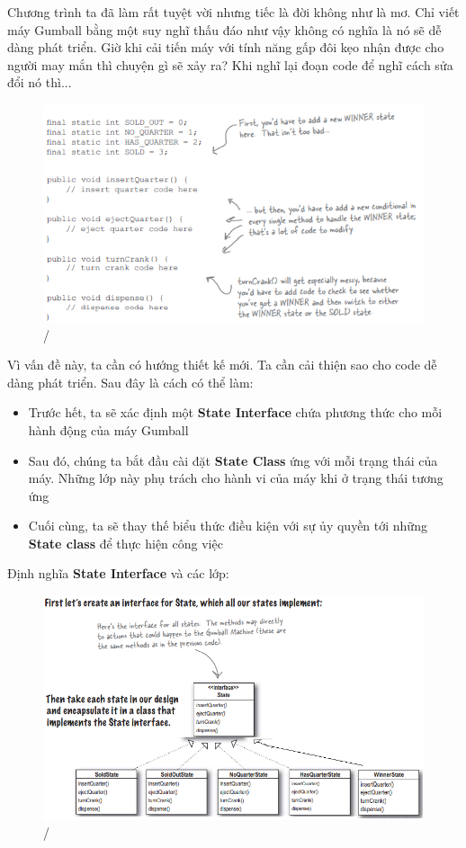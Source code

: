 Chương trình ta đã làm rất tuyệt vời nhưng tiếc là đời không như là mơ. Chỉ viết máy Gumball bằng một suy nghĩ thấu đáo như vậy không có nghĩa là nó sẽ dễ dàng phát triển. Giờ khi cải tiến máy với tính năng gấp đôi kẹo nhận được cho người may mắn thì chuyện gì sẽ xảy ra? Khi nghĩ lại đoạn code để nghĩ cách sửa đổi nó thì...
\begin{figure}[!htb]
    \centering
    \includegraphics[width=\textwidth]{fig/State/GumballProblem.png}/
\end{figure}\smallskip

\newpage
Vì vấn đề này, ta cần có hướng thiết kế mới. Ta cần cải thiện sao cho code dễ dàng phát triển. Sau đây là cách có thể làm:\smallskip

\begin{itemize}
    \item Trước hết, ta sẽ xác định một \textbf{State Interface} chứa phương thức cho mỗi hành động của máy Gumball
    \item Sau đó, chúng ta bắt đầu cài đặt \textbf{State Class} ứng với mỗi trạng thái của máy. Những lớp này phụ trách cho hành vi của máy khi ở trạng thái tương ứng
    \item Cuối cùng, ta sẽ thay thế biểu thức điều kiện với sự ủy quyền tới những \textbf{State class} để thực hiện công việc
\end{itemize}

Định nghĩa \textbf{State Interface} và các lớp:
\begin{figure}[!htb]
    \centering
    \includegraphics[width=\textwidth]{fig/State/GumballDiagram.png}/
\end{figure}\newpage

